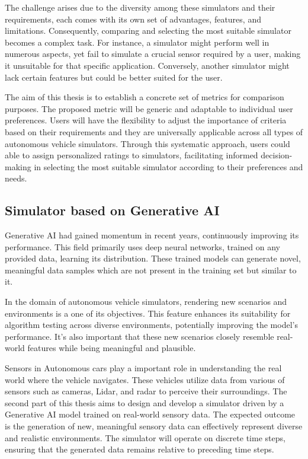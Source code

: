 \documentclass[12pt,twoside,a4paper,parskip]{scrbook} %
\begin{document}
The challenge arises due to the diversity among these simulators and their requirements, each comes with its own set of advantages, features, and limitations. Consequently, comparing and selecting the most suitable simulator becomes a complex task. For instance, a simulator might perform well in numerous aspects, yet fail to simulate a crucial sensor required by a user, making it unsuitable for that specific application. Conversely, another simulator might lack certain features but could be better suited for the user. 

The aim of this thesis is to establish a concrete set of metrics for comparison purposes. The proposed metric will be generic and adaptable to individual user preferences. Users will have the flexibility to adjust the importance of criteria based on their requirements and they are universally applicable across all types of autonomous vehicle simulators. Through this systematic approach, users could able to assign personalized ratings to simulators, facilitating informed decision-making in selecting the most suitable simulator according to their preferences and needs.

\subsection{Simulator based on Generative AI}
Generative AI had gained momentum in recent years, continuously improving its performance. This field primarily uses deep neural networks, trained on any provided data, learning its distribution. These trained models can generate novel, meaningful data samples which are not present in the training set but similar to it. 

In the domain of autonomous vehicle simulators, rendering new scenarios and environments is a one of its objectives. This feature enhances its suitability for algorithm testing across diverse environments, potentially improving the model’s performance. It’s also important that these new scenarios closely resemble real-world features while being meaningful and plausible.

Sensors in Autonomous cars play a important role in understanding the real world where the vehicle navigates. These vehicles utilize data from various of sensors such as cameras, Lidar, and radar to perceive their surroundings. The second part of this thesis aims to design and develop a simulator driven by a Generative AI model trained on real-world sensory data. The expected outcome is the generation of new, meaningful sensory data can effectively represent diverse and realistic environments. The simulator will operate on discrete time steps, ensuring that the generated data remains relative to preceding time steps.
\end{document}
